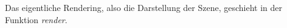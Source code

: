 
Das eigentliche Rendering, also die Darstellung der Szene, geschieht in
der Funktion \textit{render}.

